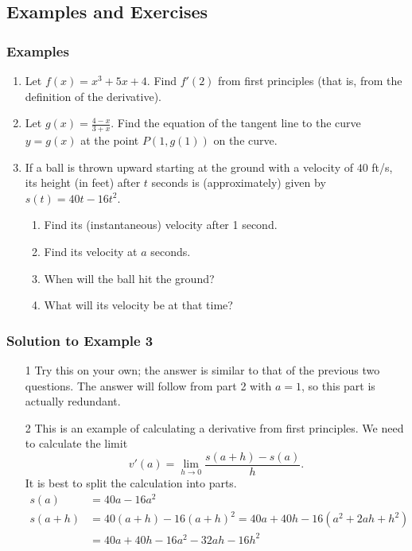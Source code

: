 \documentclass[serif,ignorenonframetext]{beamer}
\newcommand{\ds}{\displaystyle}
\begin{document}
\subsection{Examples and Exercises}

\begin{frame}
  \frametitle{Examples}
  \begin{enumerate}
  \item Let $f(x) = x^3 + 5x +4$.  Find $f'(2)$ from first principles
    (that is, from the definition of the derivative).
  \item Let $\ds g(x) = \frac{4-x}{3+x}$.  Find the equation of the 
    tangent line to the curve $y=g(x)$ at the point $P(1,g(1))$ on the curve.
  \item If a ball is thrown upward starting at the ground
    with a velocity of $40$ ft/s, its 
    height (in feet) after $t$ seconds is (approximately) given by
    $s(t)=40t-16t^2$.
    \begin{enumerate}
    \item Find its (instantaneous) velocity after 1 second.
    \item Find its velocity at $a$ seconds.
    \item When will the ball hit the ground?
    \item What will its velocity be at that time?
    \end{enumerate}
  \end{enumerate} 
\end{frame}

\begin{frame}
  \frametitle{Solution to Example 3}
  \begin{enumerate}
  \item[1] Try this on your own; the answer is similar to that of the previous
    two questions.  The answer will follow from part 2 with
    $a=1$, so this part is actually redundant.
  \item[2] This is an example of calculating a derivative
    from first principles.  We need to calculate the limit
    \begin{displaymath}
    v'(a) = \lim_{h\to 0} \frac{s(a+h)-s(a)}{h}.
    \end{displaymath}
    It is best to split the calculation into parts.
    \begin{align*}
      s(a) &= 40a-16a^2 \\
      s(a+h) &= 40(a+h)-16(a+h)^2 = 40a + 40 h -16(a^2+2ah+h^2) \\
             &= 40a + 40h -16a^2 -32ah - 16h^2
    \end{align*}
  \end{enumerate}
\end{frame}
\end{document}
